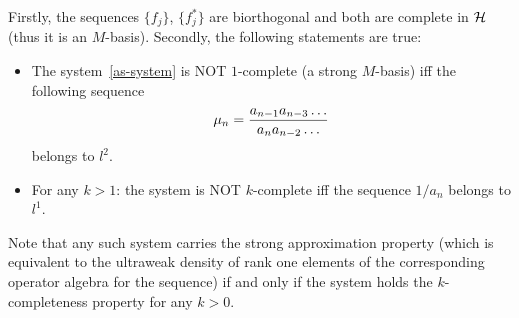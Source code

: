     \begin{theorem}
        \label{thm_as}
        Firstly, the sequences $\{f_j\}$, $\{f^*_j\}$ are biorthogonal and both are complete in $\cal{H}$ (thus it is an $M$-basis).
        Secondly, the following statements are true:
        \begin{itemize}
            \item  The system~\eqref{as-system} is NOT $1$-complete (a strong $M$-basis) iff the following sequence
                \begin{equation}
                    \mu_n = \frac{a_{n-1} a_{n-3} \dots}{a_{n} a_{n-2} \dots }\\
                \end{equation}
                belongs to $l^2$.
            \item For any $k>1$: the system is NOT $k$-complete iff the sequence $1/a_n$ belongs to $l^1$.
        \end{itemize}
    \end{theorem}
    \begin{remark}
       Note that any such system carries the strong approximation property (which is equivalent to the
       ultraweak density of rank one elements of the corresponding operator algebra for the sequence) 
       if and only if the system holds the $k$-completeness property for any $k>0$.
    \end{remark}
